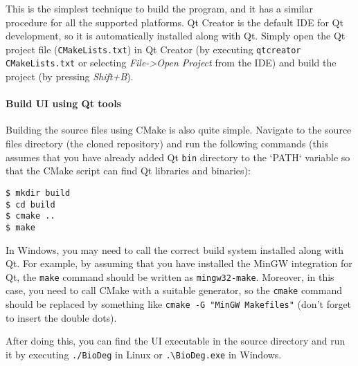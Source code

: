 This is the simplest technique to build the program, and it has a similar procedure for all the supported platforms. Qt Creator is the default IDE for Qt development, so it is automatically installed along with Qt. Simply open the Qt project file (\verb|CMakeLists.txt|) in Qt Creator (by executing \verb|qtcreator CMakeLists.txt| or selecting \textit{File->Open Project} from the IDE) and build the project (by pressing \textit{Shift+B}).

\paragraph{Build \biodeg{} UI using Qt tools}

Building the source files using CMake is also quite simple. Navigate to the source files directory (the cloned repository) and run the following commands (this assumes that you have already added Qt \verb|bin| directory to the `PATH` variable so that the CMake script can find Qt libraries and binaries):

\begin{verbatim}
$ mkdir build
$ cd build
$ cmake ..
$ make
\end{verbatim}

In Windows, you may need to call the correct build system installed along with Qt. For example, by assuming that you have installed the MinGW integration for Qt, the \verb|make| command should be written as \verb|mingw32-make|. Moreover, in this case, you need to call CMake with a suitable generator, so the \verb|cmake| command should be replaced by something like \verb|cmake -G "MinGW Makefiles"| (don't forget to insert the double dots).

After doing this, you can find the \biodeg{} UI executable in the source directory and run it by executing \verb|./BioDeg| in Linux or \verb|.\BioDeg.exe| in Windows.
